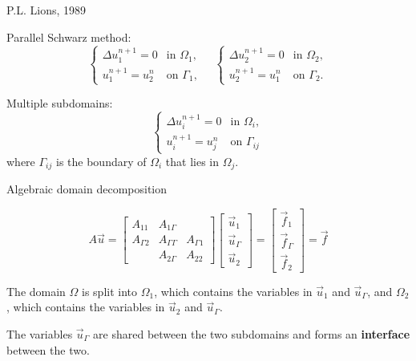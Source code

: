\documentclass{beamer}
\begin{document}
\begin{frame}{P.L. Lions, 1989}

Parallel Schwarz method:
\begin{equation*}
	\begin{cases} \Delta u_1^{n+1} = 0 & \text{in } \Omega_1, \\ u_1^{n+1} = u_2^n & \text{on } \Gamma_1, \end{cases}
	\quad
	\begin{cases} \Delta u_2^{n+1} = 0 & \text{in } \Omega_2, \\ u_2^{n+1} = u_1^{n} & \text{on } \Gamma_2. \end{cases}
\end{equation*}

Multiple subdomains:
\begin{equation*}
	\begin{cases} \Delta u_i^{n+1} = 0 & \text{in } \Omega_i, \\ u_i^{n+1} = u_j^n & \text{on } \Gamma_{ij} \end{cases}
\end{equation*}
where $\Gamma_{ij}$ is the boundary of $\Omega_i$ that lies in $\Omega_j$.
\end{frame}

\begin{frame}{Algebraic domain decomposition}

\begin{equation*}
	A \vec{u} = \begin{bmatrix} A_{11} & A_{1 \Gamma} \\ A_{\Gamma 2} & A_{\Gamma \Gamma} & A_{\Gamma 1} \\ ~ & A_{2 \Gamma} & A_{22} \end{bmatrix} \begin{bmatrix} \vec{u}_1 \\ \vec{u}_\Gamma \\ \vec{u}_2 \end{bmatrix} = \begin{bmatrix} \vec{f}_1 \\ \vec{f}_\Gamma \\ \vec{f}_2 \end{bmatrix} = \vec{f}
\end{equation*}

The domain $\Omega$ is split into $\Omega_1$, which contains the variables in $\vec{u}_1$ and $\vec{u}_\Gamma$, and $\Omega_2$, which contains the variables in $\vec{u}_2$ and $\vec{u}_\Gamma$.

The variables $\vec{u}_\Gamma$ are shared between the two subdomains and forms an \textbf{interface} between the two.
\end{frame}
\end{document}
